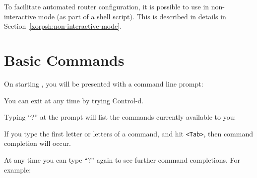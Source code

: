 To facilitate automated \xorp router configuration, it is possible to use
\xorpsh in non-interactive mode (\eg as part of a shell script).
This is described in details in Section~\ref{xorpsh:non-interactive-mode}.

\newpage
\section{Basic Commands}

On starting \xorpsh, you will be presented with a command line prompt:
\vspace{0.1in}

\noindent{}
\vspace{0.1in}

\noindent
You can exit \xorpsh at any time by trying Control-d.

\noindent
Typing ``?'' at the prompt will list the commands currently available to
you:
\vspace{0.1in}

\noindent{}
\vspace{0.1in}

\noindent
If you type the first letter or letters of a command, and hit
{\tt <Tab>}, then command completion will occur.

\noindent
At any time you can type ``?'' again to see further 
command completions.  For
example:
\vspace{0.1in}

